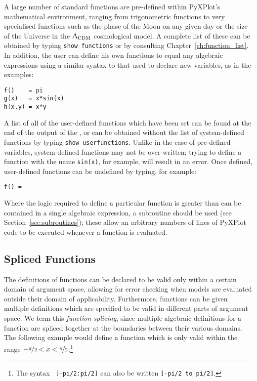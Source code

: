 A large number of standard functions are pre-defined within PyXPlot's
mathematical environment, ranging from trigonometric functions to very
specialised functions such as the phase of the Moon on any given day or the
size of the Universe in the $\Uplambda_\mathrm{CDM}$ cosmological model. A
complete list of these can be obtained by typing {\tt show
functions} or by consulting
Chapter~\ref{ch:function_list}. In addition, the user can define his own
functions to equal any algebraic expressions using a similar syntax to that
used to declare new variables, as in the examples:

\begin{verbatim}
f()    = pi
g(x)   = x*sin(x)
h(x,y) = x*y
\end{verbatim}

A list of all of the user-defined functions which have been set can be found at
the end of the output of the , or can be obtained
without the list of system-defined functions by typing {\tt show
userfunctions}. Unlike in the case of pre-defined
variables, system-defined functions may not be over-written; trying to define a
function with the name {\tt sin(x)}, for example, will result in an error.
Once defined, user-defined functions can be undefined by typing, for example:

\begin{verbatim}
f() =
\end{verbatim}

Where the logic required to define a particular function is greater than can be
contained in a single algebraic expression, a subroutine should be used (see
Section~\ref{sec:subroutines}); these allow an arbitrary numbers of lines of
PyXPlot code to be executed whenever a function is evaluated.

\subsection{Spliced Functions}  

The definitions of functions can be declared to be valid only within a certain
domain of argument space, allowing for error checking when models are evaluated
outside their domain of applicability. Furthermore, functions can be given
multiple definitions which are specified to be valid in different parts of
argument space. We term this {\it function splicing}, since multiple algebraic
definitions for a function are spliced together at the boundaries between
their various domains.  The following example would define a function which is
only valid within the range
$-\nicefrac{\pi}{2}<x<\nicefrac{\pi}{2}$:\footnote{The syntax {\tt
[-pi/2:pi/2]} can also be written {\tt [-pi/2 to pi/2]}.}

